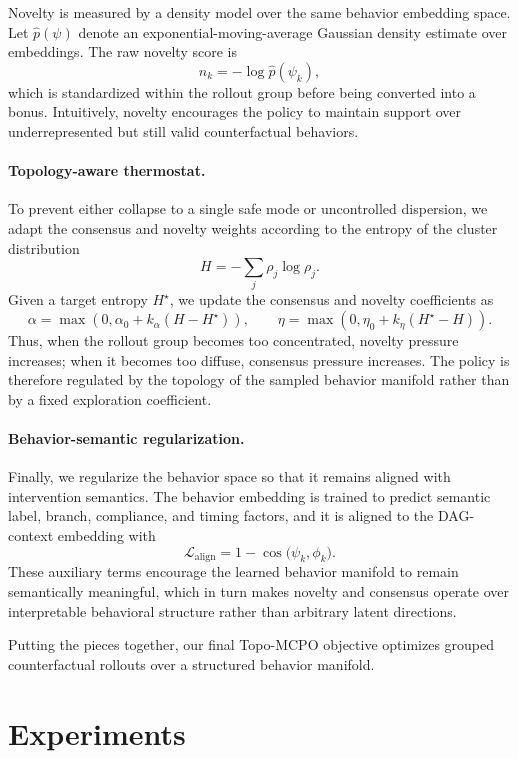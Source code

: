 \documentclass{article}
\begin{document}
Novelty is measured by a density model over the same behavior embedding space. Let $\hat{p}(\psi)$ denote an exponential-moving-average Gaussian density estimate over embeddings. The raw novelty score is
\[
n_k = -\log \hat{p}(\psi_k),
\]
which is standardized within the rollout group before being converted into a bonus. Intuitively, novelty encourages the policy to maintain support over underrepresented but still valid counterfactual behaviors.

\paragraph{Topology-aware thermostat.}
To prevent either collapse to a single safe mode or uncontrolled dispersion, we adapt the consensus and novelty weights according to the entropy of the cluster distribution
\[
H = -\sum_j \rho_j \log \rho_j.
\]
Given a target entropy $H^\star$, we update the consensus and novelty coefficients as
\[
\alpha = \max\!\left(0, \alpha_0 + k_\alpha (H - H^\star)\right),
\qquad
\eta = \max\!\left(0, \eta_0 + k_\eta (H^\star - H)\right).
\]
Thus, when the rollout group becomes too concentrated, novelty pressure increases; when it becomes too diffuse, consensus pressure increases. The policy is therefore regulated by the topology of the sampled behavior manifold rather than by a fixed exploration coefficient.

\paragraph{Behavior-semantic regularization.}
Finally, we regularize the behavior space so that it remains aligned with intervention semantics. The behavior embedding is trained to predict semantic label, branch, compliance, and timing factors, and it is aligned to the DAG-context embedding with
\[
\mathcal{L}_{\mathrm{align}}
=
1 - \cos\!\big(\psi_k,\phi_k\big).
\]
These auxiliary terms encourage the learned behavior manifold to remain semantically meaningful, which in turn makes novelty and consensus operate over interpretable behavioral structure rather than arbitrary latent directions.

Putting the pieces together, our final Topo-MCPO objective optimizes grouped counterfactual rollouts over a structured behavior manifold.

\section{Experiments}
\label{sec:experiments}
\end{document}
